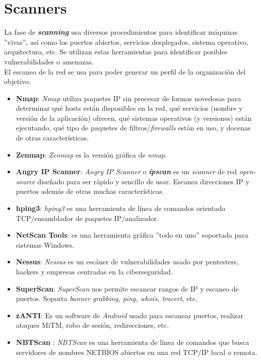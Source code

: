 \documentclass[bibliography=totocnumbered]{scrartcl}
\begin{document}
\newpage
\section{Scanners}
La fase de \textbf{\textit{scanning}} usa diversos procedimientos para identificar máquinas ''vivas'', así como los puertos abiertos, servicios desplegados, sistema operativo, arquitectura, etc. Se utilizan estas herramientas para identificar posibles vulnerabilidades o amenazas.\\
El escaneo de la red se usa para poder generar un perfil de la organización del objetivo.
\begin{itemize}
    \item \textbf{Nmap}\parencite{nmap}: \textit{Nmap} utiliza paquetes IP sin procesar de formas novedosas para determinar qué hosts están disponibles en la red, qué servicios (nombre y versión de la aplicación) ofrecen, qué sistemas operativos (y versiones) están ejecutando, qué tipo de paquetes de filtros/\textit{firewalls} están en uso, y docenas de otras características. 
    \item \textbf{Zenmap}\parencite{zenmap}: \textit{Zenmap} es la versión gráfica de \textit{nmap}\parencite{nmap}.
    \item \textbf{Angry IP Scanner}\parencite{angry}: \textit{Angry IP Scanner} o \textit{\textbf{ipscan}} es un \textit{scanner} de red \textit{open-source} diseñado para ser rápido y sencillo de usar. Escanea direcciones IP y puertos además de otras muchas características.
    \item \textbf{hping3}\parencite{hping3}: \textit{hping3} es una herramienta de línea de comandos orientado TCP/ensamblador de paquetes IP/analizador.
    \item \textbf{NetScan Tools}\parencite{netscan}: es una herramienta gráfica ''todo en uno'' soportada para sistemas Windows.
    \item \textbf{Nessus}\parencite{nessus}: \textit{Nessus} es un escáner de vulnerabilidades usado por pentesters, hackers y empresas centradas en la ciberseguridad.
    \item \textbf{SuperScan}\parencite{superscan}: \textit{SuperScan} nos permite escanear rangos de IP y escaneo de puertos. Soporta \textit{banner grabbing, ping, whois, tracert}, etc.
    \item \textbf{zANTI}\parencite{zanti}: Es un software de \textit{Android} usado para escanear puertos, realizar ataques MiTM\parencite{mitm}, robo de sesión, redirecciones, etc.
    \item \textbf{NBTScan} \parencite{nbtscan}: \textit{NBTScan} es una herramienta de línea de comandos que busca servidores de nombres NETBIOS\parencite{netbios} abiertos en una red TCP/IP local o remota.
\end{itemize}
\end{document}
